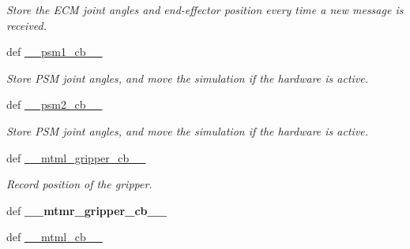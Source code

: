 \begin{DoxyCompactItemize}
\begin{DoxyCompactList}\small\item\em Store the E\-C\-M joint angles and end-\/effector position every time a new message is received. \end{DoxyCompactList}\item 
\hypertarget{classcamera__control__node_1_1Teleop__class_a50fb7e9fcae8d34ef9e55f0bfd2fe556}{def \hyperlink{classcamera__control__node_1_1Teleop__class_a50fb7e9fcae8d34ef9e55f0bfd2fe556}{\-\_\-\-\_\-psm1\-\_\-cb\-\_\-\-\_\-}}\label{classcamera__control__node_1_1Teleop__class_a50fb7e9fcae8d34ef9e55f0bfd2fe556}

\begin{DoxyCompactList}\small\item\em Store P\-S\-M joint angles, and move the simulation if the hardware is active. \end{DoxyCompactList}\item 
\hypertarget{classcamera__control__node_1_1Teleop__class_a31ebacabdaedc801b01412c81cf724a4}{def \hyperlink{classcamera__control__node_1_1Teleop__class_a31ebacabdaedc801b01412c81cf724a4}{\-\_\-\-\_\-psm2\-\_\-cb\-\_\-\-\_\-}}\label{classcamera__control__node_1_1Teleop__class_a31ebacabdaedc801b01412c81cf724a4}

\begin{DoxyCompactList}\small\item\em Store P\-S\-M joint angles, and move the simulation if the hardware is active. \end{DoxyCompactList}\item 
\hypertarget{classcamera__control__node_1_1Teleop__class_ae49f0d97f251087fa57405ff80fbd096}{def \hyperlink{classcamera__control__node_1_1Teleop__class_ae49f0d97f251087fa57405ff80fbd096}{\-\_\-\-\_\-mtml\-\_\-gripper\-\_\-cb\-\_\-\-\_\-}}\label{classcamera__control__node_1_1Teleop__class_ae49f0d97f251087fa57405ff80fbd096}

\begin{DoxyCompactList}\small\item\em Record position of the gripper. \end{DoxyCompactList}\item 
\hypertarget{classcamera__control__node_1_1Teleop__class_acede2659e1f07f7f71e08b946ec7534b}{def {\bfseries \-\_\-\-\_\-mtmr\-\_\-gripper\-\_\-cb\-\_\-\-\_\-}}\label{classcamera__control__node_1_1Teleop__class_acede2659e1f07f7f71e08b946ec7534b}

\item 
\hypertarget{classcamera__control__node_1_1Teleop__class_a308840971430d6dfcc4ddf4f7b21211c}{def \hyperlink{classcamera__control__node_1_1Teleop__class_a308840971430d6dfcc4ddf4f7b21211c}{\-\_\-\-\_\-mtml\-\_\-cb\-\_\-\-\_\-}}\label{classcamera__control__node_1_1Teleop__class_a308840971430d6dfcc4ddf4f7b21211c}


\end{DoxyCompactItemize}
